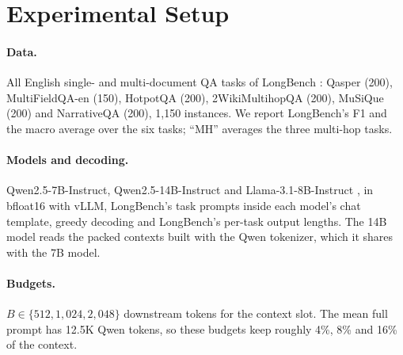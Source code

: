 \documentclass[11pt]{article}
\begin{document}
\section{Experimental Setup}
\label{sec:setup}

\paragraph{Data.} All English single- and multi-document QA tasks of LongBench \citep{bai2023longbench}: Qasper \citep{dasigi2021qasper} (200), MultiFieldQA-en (150), HotpotQA \citep{yang2018hotpotqa} (200), 2WikiMultihopQA \citep{ho2020constructing} (200), MuSiQue \citep{trivedi2022musique} (200) and NarrativeQA \citep{kocisky2018narrativeqa} (200), 1,150 instances. We report LongBench's F1 and the macro average over the six tasks; ``MH'' averages the three multi-hop tasks.

\paragraph{Models and decoding.} Qwen2.5-7B-Instruct, Qwen2.5-14B-Instruct \citep{qwen2025qwen25} and Llama-3.1-8B-Instruct \citep{grattafiori2024llama3}, in bfloat16 with vLLM, LongBench's task prompts inside each model's chat template, greedy decoding and LongBench's per-task output lengths. The 14B model reads the packed contexts built with the Qwen tokenizer, which it shares with the 7B model.

\paragraph{Budgets.} $B\in\{512, 1{,}024, 2{,}048\}$ downstream tokens for the context slot. The mean full prompt has 12.5K Qwen tokens, so these budgets keep roughly 4\%, 8\% and 16\% of the context.
\end{document}
